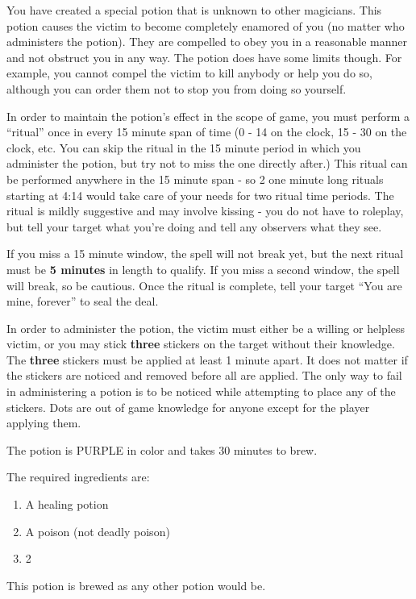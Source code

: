 \documentclass[green]{NeptuneBall}
\begin{document}
\name{\gLove{}}

You have created a special potion that is unknown to other magicians. This potion causes the victim to become completely enamored of you (no matter who administers the potion). They are compelled to obey you in a reasonable manner and not obstruct you in any way. The potion does have some limits though. For example, you cannot compel the victim to kill anybody or help you do so, although you can order them not to stop you from doing so yourself.

In order to maintain the potion's effect in the scope of game, you must perform a ``ritual'' once in every 15 minute span of time (0 - 14 on the clock, 15 - 30 on the clock, etc. You can skip the ritual in the 15 minute period in which you administer the potion, but try not to miss the one directly after.) This ritual can be performed anywhere in the 15 minute span - so 2 one minute long rituals starting at 4:14 would take care of your needs for two ritual time periods. The ritual is mildly suggestive and may involve kissing - you do not have to roleplay, but tell your target what you're doing and tell any observers what they see.

If you miss a 15 minute window, the spell will not break yet, but the next ritual must be {\bf5 minutes} in length to qualify. If you miss a second window, the spell will break, so be cautious. Once the ritual is complete, tell your target ``You are mine, forever'' to seal the deal.

In order to administer the potion, the victim must either be a willing or helpless victim, or you may stick {\bf three} stickers on the target without their knowledge. The {\bf three} stickers must be applied at least 1 minute apart. It does not matter if the stickers are noticed and removed before all are applied. The only way to fail in administering a potion is to be noticed while attempting to place any of the stickers. Dots are out of game knowledge for anyone except for the player applying them.

The potion is PURPLE in color and takes 30 minutes to brew.

The required ingredients are:
\begin{enumerate}
\item A healing potion 
\item A poison (not deadly poison)
\item 2 \iPearl{}
\end{enumerate}

This potion is brewed as any other potion would be.\\
\end{document}
